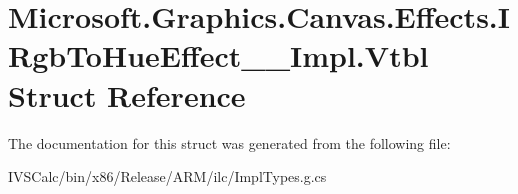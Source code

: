 \hypertarget{struct_microsoft_1_1_graphics_1_1_canvas_1_1_effects_1_1_i_rgb_to_hue_effect_____impl_1_1_vtbl}{}\section{Microsoft.\+Graphics.\+Canvas.\+Effects.\+I\+Rgb\+To\+Hue\+Effect\+\_\+\+\_\+\+Impl.\+Vtbl Struct Reference}
\label{struct_microsoft_1_1_graphics_1_1_canvas_1_1_effects_1_1_i_rgb_to_hue_effect_____impl_1_1_vtbl}


The documentation for this struct was generated from the following file\+:\begin{DoxyCompactItemize}
\item 
I\+V\+S\+Calc/bin/x86/\+Release/\+A\+R\+M/ilc/Impl\+Types.\+g.\+cs\end{DoxyCompactItemize}
